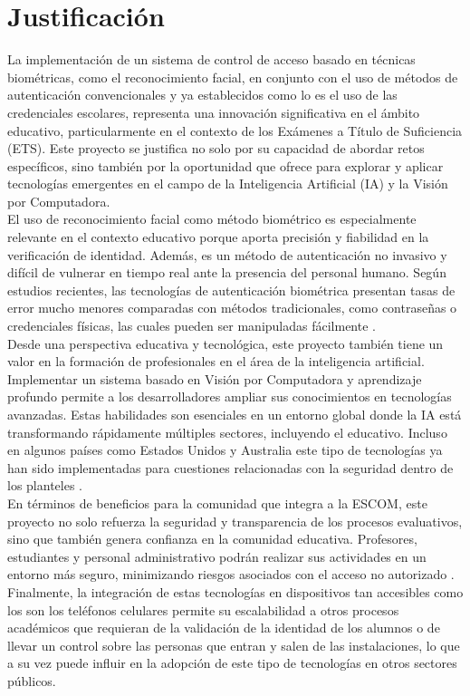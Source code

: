 
\section{Justificación}

La implementación de un sistema de control de acceso basado en técnicas biométricas, como el reconocimiento facial, en conjunto con el uso de métodos de autenticación convencionales y ya establecidos como lo es el uso de las credenciales escolares, representa una innovación significativa en el ámbito educativo, particularmente en el contexto de los Exámenes a Título de Suficiencia (ETS). Este proyecto se justifica no solo por su capacidad de abordar retos específicos, sino también por la oportunidad que ofrece para explorar y aplicar tecnologías emergentes en el campo de la Inteligencia Artificial (IA) y la Visión por Computadora.\\

El uso de reconocimiento facial como método biométrico es especialmente relevante en el contexto educativo porque aporta precisión y fiabilidad en la verificación de identidad. Además, es un método de autenticación no invasivo y difícil de vulnerar en tiempo real ante la presencia del personal humano. Según estudios recientes, las tecnologías de autenticación biométrica presentan tasas de error mucho menores comparadas con métodos tradicionales, como contraseñas o credenciales físicas, las cuales pueden ser manipuladas fácilmente \cite{L06}.\\

Desde una perspectiva educativa y tecnológica, este proyecto también tiene un valor en la formación de profesionales en el área de la inteligencia artificial. Implementar un sistema basado en Visión por Computadora y aprendizaje profundo permite a los desarrolladores ampliar sus conocimientos en tecnologías avanzadas. Estas habilidades son esenciales en un entorno global donde la IA está transformando rápidamente múltiples sectores, incluyendo el educativo. Incluso en algunos países como Estados Unidos y Australia este tipo de tecnologías ya han sido implementadas para cuestiones relacionadas con la seguridad dentro de los planteles \cite{L04}.\\

En términos de beneficios para la comunidad que integra a la ESCOM, este proyecto no solo refuerza la seguridad y transparencia de los procesos evaluativos, sino que también genera confianza en la comunidad educativa. Profesores, estudiantes y personal administrativo podrán realizar sus actividades en un entorno más seguro, minimizando riesgos asociados con el acceso no autorizado \cite{L05}. \\

Finalmente, la integración de estas tecnologías en dispositivos tan accesibles como los son los teléfonos celulares permite su escalabilidad a otros procesos académicos que requieran de la validación de la identidad de los alumnos o de llevar un control sobre las personas que entran y salen de las instalaciones, lo que a su vez puede influir en la adopción de este tipo de tecnologías en otros sectores públicos.
